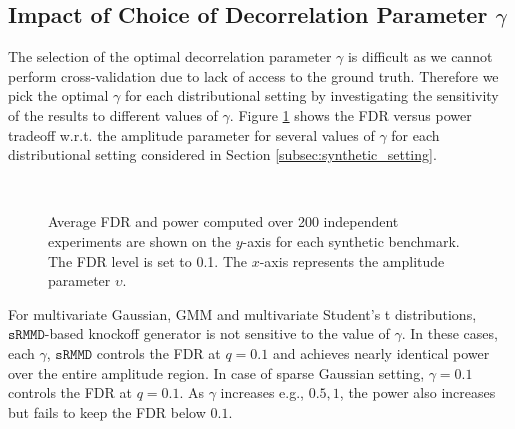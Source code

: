 \documentclass{article}
\theoremstyle{definition}
\newcommand{\srmmd}{\mathtt{sRMMD}}
\begin{document}
\subsection{Impact of Choice of Decorrelation Parameter \texorpdfstring{$\gamma$}{gamma}}
The selection of the optimal decorrelation parameter $\gamma$ is difficult as we cannot perform cross-validation due to lack of access to the ground truth. Therefore we pick the optimal $\gamma$ for each distributional setting by investigating the sensitivity of the results to different values of $\gamma$. Figure \ref{fig:fdr_decor} shows the FDR versus power tradeoff w.r.t. the amplitude parameter for several values of $\gamma$ for each distributional setting considered in Section \ref{subsec:synthetic_setting}.
\begin{figure}[H]
\centering
  \quad
  \\
    \quad
  \caption{Average FDR and power computed over 200 independent experiments are shown on the $y$-axis  for each synthetic benchmark. The FDR level is set to 0.1.  The $x$-axis represents the amplitude parameter $\upsilon$.}
    \label{fig:fdr_decor}
    \vspace{-4mm}
\end{figure}
For multivariate Gaussian, GMM and multivariate Student's t distributions, $\srmmd$-based knockoff generator is not sensitive to the value of $\gamma$. In these cases, each $\gamma$, $\srmmd$ controls the FDR at $q=0.1$ and achieves nearly identical power over the entire amplitude region. In case of sparse Gaussian setting, $\gamma= 0.1$ controls the FDR at $q=0.1$. As $\gamma$ increases e.g., $0.5, 1$, the power also increases but fails to keep the FDR below $0.1$. 
\end{document}
